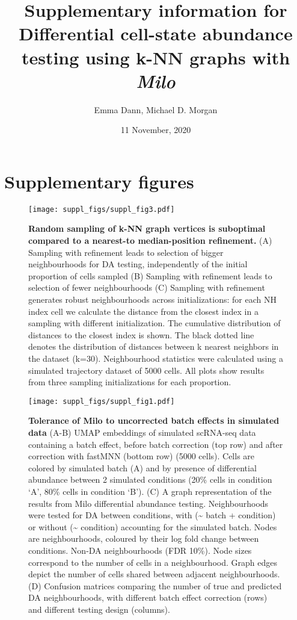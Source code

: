 \documentclass[
]{article}
\title{Supplementary information for
\textbf{Differential cell-state abundance testing using k-NN graphs with \emph{Milo}}}
\author{Emma Dann, Michael D. Morgan}
\date{11 November, 2020}
\begin{document}
\maketitle

{
\setcounter{tocdepth}{3}
\tableofcontents
}
\renewcommand{\figurename}{Supplementary Figure}

\newpage

\hypertarget{supplementary-figures}{%
\section{Supplementary figures}\label{supplementary-figures}}

\begin{figure}
\centering
\texttt{[image: suppl\_figs/suppl\_fig3.pdf]}
\caption{\label{fig:sup-fig-3}\textbf{Random sampling of k-NN graph vertices is suboptimal compared to a nearest-to median-position refinement.}
(A) Sampling with refinement leads to selection of bigger neighbourhoods for DA testing, independently of the initial proportion of cells sampled
(B) Sampling with refinement leads to selection of fewer neighbourhoods
(C) Sampling with refinement generates robust neighbourhoods across initializations: for each NH index cell we calculate the distance from the closest index in a sampling with different initialization. The cumulative distribution of distances to the closest index is shown. The black dotted line denotes the distribution of distances between k nearest neighbors in the dataset (k=30).
Neighbourhood statistics were calculated using a simulated trajectory dataset of 5000 cells. All plots show results from three sampling initializations for each proportion.}
\end{figure}







\begin{figure}
\centering
\texttt{[image: suppl\_figs/suppl\_fig1.pdf]}
\caption{\label{fig:sup-fig-1}\textbf{Tolerance of Milo to uncorrected batch effects in simulated data}
(A-B) UMAP embeddings of simulated scRNA-seq data containing a batch effect, before batch correction (top row) and after correction with fastMNN (bottom row) (5000 cells). Cells are colored by simulated batch (A) and by presence of differential abundance between 2 simulated conditions (20\% cells in condition `A', 80\% cells in condition `B').
(C) A graph representation of the results from Milo differential abundance testing. Neighbourhoods were tested for DA between conditions, with (\textasciitilde{} batch + condition) or without (\textasciitilde{} condition) accounting for the simulated batch. Nodes are neighbourhoods, coloured by their log fold change between conditions. Non-DA neighbourhoods (FDR 10\%). Node sizes correspond to the number of cells in a neighbourhood. Graph edges depict the number of cells shared between adjacent neighbourhoods.
(D) Confusion matrices comparing the number of true and predicted DA neighbourhoods, with different batch effect correction (rows) and different testing design (columns).}
\end{figure}
\end{document}
